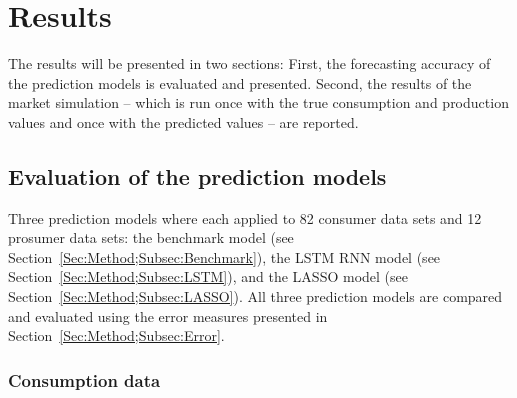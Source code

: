 
\section{Results}\label{Sec:Results}

The results will be presented in two sections: First, the forecasting accuracy of the prediction models is evaluated and presented. Second, the results of the market simulation -- which is run once with the true consumption and production values and once with the predicted values -- are reported.



\subsection{Evaluation of the prediction models}\label{Sec:Results;Subsec:Forecast}

Three prediction models where each applied to 82 consumer data sets and 12 prosumer data sets: the benchmark model (see Section~\ref{Sec:Method;Subsec:Benchmark}), the LSTM RNN model (see Section~\ref{Sec:Method;Subsec:LSTM}), and the LASSO model (see Section~\ref{Sec:Method;Subsec:LASSO}). All three prediction models are compared and evaluated using the error measures presented in Section~\ref{Sec:Method;Subsec:Error}.


\subsubsection{Consumption data}

